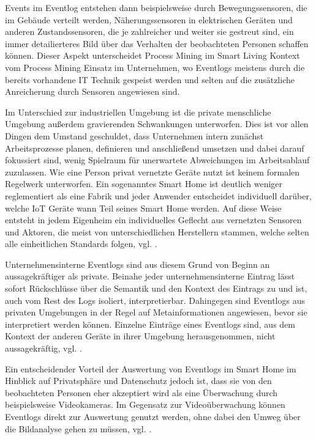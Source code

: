 Events im Eventlog entstehen dann beispielsweise durch Bewegungssensoren, die im Gebäude verteilt werden, Näherungssensoren in elektrischen Geräten und anderen Zustandssensoren, die je zahlreicher und weiter sie gestreut sind, ein immer detailierteres Bild über das Verhalten der beobachteten Personen schaffen können. 
Dieser Aspekt unterscheidet Process Mining im Smart Living Kontext vom Process Mining Einsatz im Unternehmen, wo Eventlogs meistens durch die bereits vorhandene IT Technik gespeist werden und selten auf die zusätzliche Anreicherung durch Sensoren angewiesen sind.
 
Im Unterschied zur industriellen Umgebung ist die private menschliche Umgebung außerdem gravierenden Schwankungen unterworfen. Dies ist vor allen Dingen dem Umstand geschuldet, dass Unternehmen intern zunächst Arbeitsprozesse planen, definieren und anschließend umsetzen und dabei darauf fokussiert sind, wenig Spielraum für unerwartete Abweichungen im Arbeitsablauf zuzulassen. 
Wie eine Person privat vernetzte Geräte nutzt ist keinem formalen Regelwerk unterworfen. Ein sogenanntes Smart Home ist deutlich weniger reglementiert als eine Fabrik und jeder Anwender entscheidet individuell darüber, welche IoT Geräte wann Teil seines Smart Home werden. Auf diese Weise entsteht in jedem Eigenheim ein individuelles Geflecht aus vernetzten Sensoren und Aktoren, die meist von unterschiedlichen Herstellern stammen, welche selten alle einheitlichen Standards folgen, vgl. \cite{adl2}.

Unternehmensinterne Eventlogs sind aus diesem Grund von Beginn an aussagekräftiger als private. Beinahe jeder unternehmensinterne  Eintrag lässt sofort Rückschlüsse über die Semantik und den Kontext des Eintrags zu und ist, auch vom Rest des Logs isoliert, interpretierbar. Dahingegen sind Eventlogs aus privaten Umgebungen in der Regel auf Metainformationen angewiesen, bevor sie interpretiert werden können. Einzelne Einträge eines Eventlogs sind, aus dem Kontext der anderen Geräte in ihrer Umgebung herausgenommen, nicht aussagekräftig, vgl. \cite{Jaroucheh2011}.

Ein entscheidender Vorteil der Auswertung von Eventlogs im Smart Home im Hinblick auf Privatsphäre und Datenschutz jedoch ist, dass sie von den beobachteten Personen eher akzeptiert wird als eine Überwachung durch beispielsweise Videokameras. Im Gegensatz zur Videoüberwachung können Eventlogs direkt zur Auswertung genutzt werden, ohne dabei den Umweg über die Bildanalyse gehen zu müssen, vgl. \cite{TaxSidorova}.

